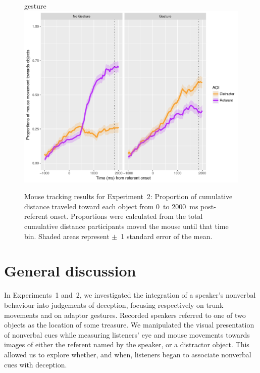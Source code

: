 \documentclass[a4paper,man,natbib]{apa6}
\begin{document}
\begin{figure}[Ht]gesture
  \centering
	\includegraphics[width=\linewidth]{./img/e8_mouset.pdf}
  \caption{Mouse tracking results for Experiment~2: Proportion of cumulative distance traveled toward each object from 0~to 2000~ms post-referent onset. Proportions were calculated from the total cumulative distance participants moved the mouse until that time bin. Shaded areas represent $\pm$~1 standard error of the mean.}
  \label{fig:v2_mouse}
\end{figure}

\section{General discussion}


In Experiments~1 and~2, we investigated the integration of a speaker's nonverbal behaviour into judgements of deception, focusing respectively on trunk movements and on adaptor gestures.
Recorded speakers referred to one of two objects as the location of some treasure.
We manipulated the visual presentation of nonverbal cues while measuring listeners' eye and mouse movements towards images of either the referent named by the speaker, or a distractor object.
This allowed us to explore whether, and when, listeners began to associate nonverbal cues with deception.
\end{document}
